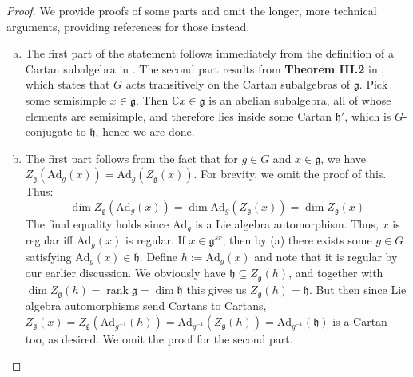 \documentclass[11pt]{article}
\newcommand{\C}{\mathbb{C}}
\newcommand{\rk}{\operatorname{rank}}
\theoremstyle{definition}
\numberwithin{equation}{section} %
\begin{document}
\begin{proof}
We provide proofs of some parts and omit the longer, more technical arguments, providing references for those instead.
    \begin{enumerate}[(a)]
        \item %
        The first part of the statement follows immediately from the definition of a Cartan subalgebra in \cite{ClassLectureNotes}. The second part results from \textbf{Theorem III.2} in \cite{Serre2001ComplexSemisimpleLieAlgebras}, which states that $G$ acts transitively on the Cartan subalgebras of $\mathfrak{g}$. Pick some semisimple $x\in \mathfrak{g}$. Then $\C x\in \mathfrak{g}$ is an abelian subalgebra, all of whose elements are semisimple, and therefore lies inside some Cartan $\mathfrak{h}'$, which is $G$-conjugate to $\mathfrak{h}$, hence we are done.

        \item The first part follows from the fact that for $g\in G$ and $x\in \mathfrak{g}$, we have $Z_\mathfrak{g}\left(\mathrm{Ad}_g(x)\right) = \mathrm{Ad}_g\left(Z_\mathfrak{g}(x)\right)$. For brevity, we omit the proof of this. Thus:
        $$
        \dim Z_\mathfrak{g}\left(\mathrm{Ad}_g(x)\right) = \dim \mathrm{Ad}_g\left(Z_\mathfrak{g}(x)\right) = \dim Z_\mathfrak{g}(x)
        $$
        The final equality holds since $\mathrm{Ad}_g$ is a Lie algebra automorphism. Thus, $x$ is regular iff $\mathrm{Ad}_g(x)$ is regular. If $x\in \mathfrak{g}^{sr}$, then by (a) there exists some $g\in G$ satisfying $\mathrm{Ad}_g(x) \in \mathfrak{h}$. Define $h:= \mathrm{Ad}_g(x)$ and note that it is regular by our earlier discussion. We obviously have $\mathfrak{h} \subseteq  Z_\mathfrak{g}(h)$, and together with $\dim Z_\mathfrak{g}(h) = \rk \mathfrak{g} = \dim \mathfrak{h}$ this gives us $ Z_\mathfrak{g}(h) = \mathfrak{h}$. But then since Lie algebra automorphisms send Cartans to Cartans, $Z_\mathfrak{g}(x) = Z_\mathfrak{g}\left(\mathrm{Ad}_{g^{-1}}(h)\right) = \mathrm{Ad}_{g^{-1}}\left(Z_\mathfrak{g}(h)\right) = \mathrm{Ad}_{g^{-1}}(\mathfrak{h})$ is a Cartan too, as desired. We omit the proof for the second part. 


\end{enumerate}
\end{proof}
\end{document}
